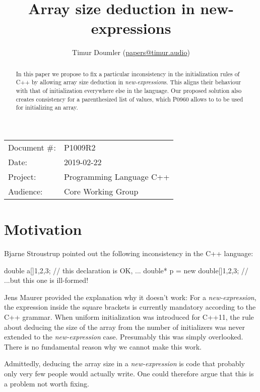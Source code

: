 


\title{Array size deduction in new-expressions}
\author{
  Timur Doumler \small(\href{mailto:papers@timur.audio}{papers@timur.audio})
}
\date{}
\maketitle

\begin{tabular}{ll}
Document \#: & P1009R2 \\
Date: & 2019-02-22\\
Project: & Programming Language C++ \\
Audience: & Core Working Group
\end{tabular}


\begin{abstract}
In this paper we propose to fix a particular inconsistency in the initialization rules of C++ by allowing array size deduction in \emph{new-expression}s. This aligns their behaviour with that of initialization everywhere else in the language. Our proposed solution also creates consistency for a parenthesized list of values, which P0960 allows to to be used for initializing an array.
\end{abstract}

\vspace{5mm}

\section{Motivation}

Bjarne Stroustrup pointed out the following inconsistency in the C++ language:

\begin{codeblock}
double a[]{1,2,3};                // this declaration is OK, ...
double* p = new double[]{1,2,3};  // ...but this one is ill-formed!
\end{codeblock}

Jens Maurer provided the explanation why it doesn't work: For a \emph{new-expression}, the expression inside the square brackets is currently mandatory according to the C++ grammar. When uniform initialization was introduced for C++11, the rule about deducing the size of the array from the number of initializers was never extended to the \emph{new-expression} case. Presumably this was simply overlooked. There is no fundamental reason why we cannot make this work.

Admittedly, deducing the array size in a \emph{new-expression} is code that probably only very few people would actually write. One could therefore argue that this is a problem not worth fixing.

